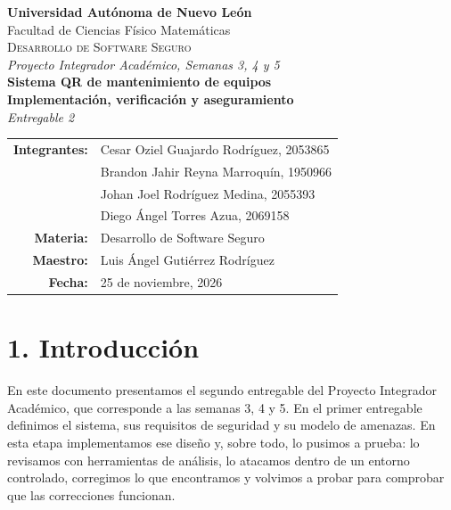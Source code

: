 \documentclass[12pt, letterpaper]{article}
\newcommand{\materia}{Desarrollo de Software Seguro}
\newcommand{\fecha}{25 de noviembre, 2026}
\begin{document}
\thispagestyle{empty}
\begin{center}
  \vspace*{1.2cm}
  {\large \textbf{Universidad Autónoma de Nuevo León}}\\[0.2cm]
  {\normalsize Facultad de Ciencias Físico Matemáticas}\\[1cm]
  {\large \textsc{\materia}}\\[0.4cm]
  {\normalsize \textit{Proyecto Integrador Académico, Semanas 3, 4 y 5}}\\[2.4cm]
  {\LARGE \textbf{Sistema QR de mantenimiento de equipos}}\\[0.5cm]
  {\Large \textbf{Implementación, verificación y aseguramiento}}\\[1.2cm]
  {\large \textit{Entregable 2}}\\[2cm]
  \renewcommand{\arraystretch}{1.6}
  \begin{tabular}{r l}
    \textbf{Integrantes:} & Cesar Oziel Guajardo Rodríguez, 2053865 \\
                          & Brandon Jahir Reyna Marroquín, 1950966 \\
                          & Johan Joel Rodríguez Medina, 2055393 \\
                          & Diego Ángel Torres Azua, 2069158 \\
    \textbf{Materia:}     & \materia \\
    \textbf{Maestro:}     & Luis Ángel Gutiérrez Rodríguez \\
    \textbf{Fecha:}       & \fecha \\
  \end{tabular}
\end{center}
\newpage
\renewcommand{\contentsname}{Índice}
{\singlespacing\setlength{\parskip}{0pt}%
\tableofcontents}
\newpage
{}

\section{1. Introducción}

En este documento presentamos el segundo entregable del Proyecto Integrador Académico, que corresponde a las semanas 3, 4 y 5. En el primer entregable definimos el sistema, sus requisitos de seguridad y su modelo de amenazas. En esta etapa implementamos ese diseño y, sobre todo, lo pusimos a prueba: lo revisamos con herramientas de análisis, lo atacamos dentro de un entorno controlado, corregimos lo que encontramos y volvimos a probar para comprobar que las correcciones funcionan.
\end{document}
